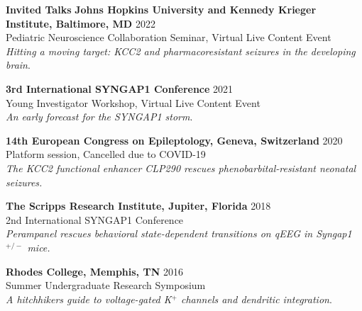 \documentclass{resume} %
\begin{document}
\begin{rSection}{{\bfseries Invited Talks}}
    {\bfseries Johns Hopkins University and Kennedy Krieger Institute, Baltimore, MD} \hfill {2022} 
   \\ Pediatric Neuroscience Collaboration Seminar, Virtual Live Content Event
   \\ \emph{Hitting a moving target: KCC2 and pharmacoresistant seizures in the developing brain}.
   \item  {\bfseries 3rd International SYNGAP1 Conference} \hfill {2021}
   \\ Young Investigator Workshop, Virtual Live Content Event
   \\ \emph{An early forecast for the SYNGAP1 storm}.
   \item {\bfseries 14th European Congress on Epileptology, Geneva, Switzerland} \hfill{2020}
    \\  Platform session, Cancelled due to COVID-19
    \\ \emph{The KCC2 functional enhancer CLP290 rescues phenobarbital-resistant neonatal seizures.}
    \item {\bfseries The Scripps Research Institute, Jupiter, Florida} \hfill{2018}
    \\ 2nd International SYNGAP1 Conference
    \\ \emph{Perampanel rescues behavioral state-dependent transitions on qEEG in Syngap1$^{+/-}$ mice.} \vspace{0.3\baselineskip}
    \item {\bfseries Rhodes College, Memphis, TN} \hfill{2016}
    \\ Summer Undergraduate Research Symposium
    \\ \emph{A hitchhikers guide to voltage-gated K$^+$  channels and dendritic integration}.
\end{rSection}
\end{document}
